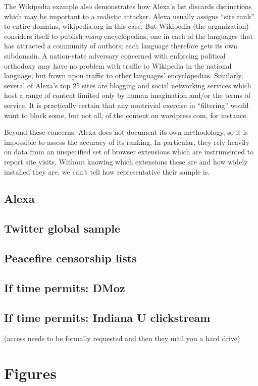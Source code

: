 \documentclass[tinymargin]{zarticle}
\begin{document}
The Wikipedia example also demonstrates how Alexa's list discards
distinctions which may be important to a realistic attacker.  Alexa
usually assigns “site rank” to entire domains, \textsf{wikipedia.org}
in this case.  But Wikipedia (the organization) considers itself to
publish \emph{many} encyclopedias, one in each of the languages that
has attracted a community of authors; each language therefore gets its
own subdomain.  A nation-state adversary concerned with enforcing
political orthodoxy may have no problem with traffic to Wikipedia in
the national language, but frown upon traffic to other languages'
encyclopedias.  Similarly, several of Alexa's top 25 sites are
blogging and social networking services which host a range of content
limited only by human imagination and/or the terms of service.  It is
practically certain that any nontrivial exercise in “filtering” would
want to block some, but not all, of the content on
\textsf{wordpress.com}, for instance.

Beyond these concerns, Alexa does not document its own methodology, so
it is impossible to assess the accuracy of its ranking.  In
particular, they rely heavily on data from an unspecified set of
browser extensions which are instrumented to report site visits.
Without knowing which extensions these are and how widely installed
they are, we can't tell how representative their sample is.



\subsection{Alexa}

\subsection{Twitter global sample}

\subsection{Peacefire censorship lists}

\subsection{If time permits: DMoz}

\subsection{If time permits: Indiana U clickstream}

(access needs to be formally requested and then they mail you a hard drive)

\printbibliography
\clearpage
\appendix
\section{Figures}
\FloatBarrier


\end{document}
